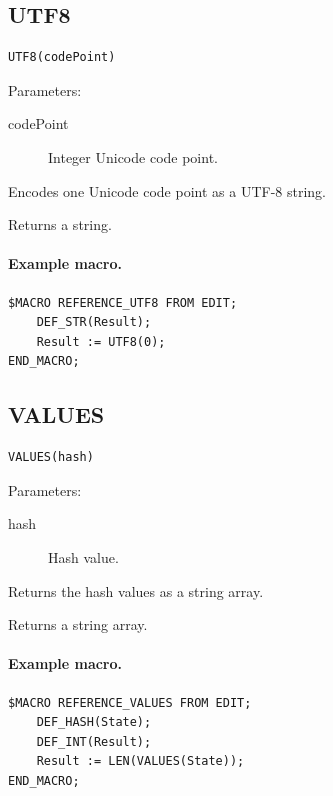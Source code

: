 \documentclass[a4paper,10pt,twoside,openany]{book}
\newenvironment{mrmacextension}{\begin{changebar}}{\end{changebar}}
\begin{document}
\begin{mrmacextension}
\label{prim:intrinsic-utf8}
\subsection*{UTF8}
\begin{verbatim}
UTF8(codePoint)
\end{verbatim}
Parameters:
\begin{description}
\item[codePoint] Integer Unicode code point.
\end{description}

Encodes one Unicode code point as a UTF-8 string.

Returns a string.

\paragraph{Example macro.}
\begin{verbatim}
$MACRO REFERENCE_UTF8 FROM EDIT;
    DEF_STR(Result);
    Result := UTF8(0);
END_MACRO;
\end{verbatim}
\end{mrmacextension}

\begin{mrmacextension}
\label{prim:intrinsic-values}
\subsection*{VALUES}
\begin{verbatim}
VALUES(hash)
\end{verbatim}
Parameters:
\begin{description}
\item[hash] Hash value.
\end{description}

Returns the hash values as a string array.

Returns a string array.

\paragraph{Example macro.}
\begin{verbatim}
$MACRO REFERENCE_VALUES FROM EDIT;
    DEF_HASH(State);
    DEF_INT(Result);
    Result := LEN(VALUES(State));
END_MACRO;
\end{verbatim}
\end{mrmacextension}
\end{document}

